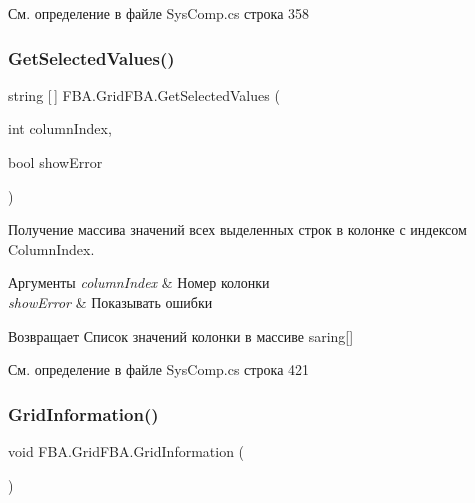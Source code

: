 См. определение в файле Sys\+Comp.\+cs строка 358

\mbox{\label{class_f_b_a_1_1_grid_f_b_a_a1d3c3a44ac6397c8872d8d7f96467821}} 
\subsubsection{\texorpdfstring{Get\+Selected\+Values()}{GetSelectedValues()}}
{\footnotesize\ttfamily string \mbox{[}$\,$\mbox{]} F\+B\+A.\+Grid\+F\+B\+A.\+Get\+Selected\+Values (\begin{DoxyParamCaption}\item[{int}]{column\+Index,  }\item[{bool}]{show\+Error }\end{DoxyParamCaption})}



Получение массива значений всех выделенных строк в колонке с индексом Column\+Index. 


\begin{DoxyParams}{Аргументы}
{\em column\+Index} & Номер колонки\\
\hline
{\em show\+Error} & Показывать ошибки\\
\hline
\end{DoxyParams}
\begin{DoxyReturn}{Возвращает}
Список значений колонки в массиве saring\mbox{[}\mbox{]}
\end{DoxyReturn}


См. определение в файле Sys\+Comp.\+cs строка 421

\mbox{\label{class_f_b_a_1_1_grid_f_b_a_a675569672fd3cd42cb66cbefeba15611}} 
\subsubsection{\texorpdfstring{Grid\+Information()}{GridInformation()}}
{\footnotesize\ttfamily void F\+B\+A.\+Grid\+F\+B\+A.\+Grid\+Information (\begin{DoxyParamCaption}{ }\end{DoxyParamCaption})}





